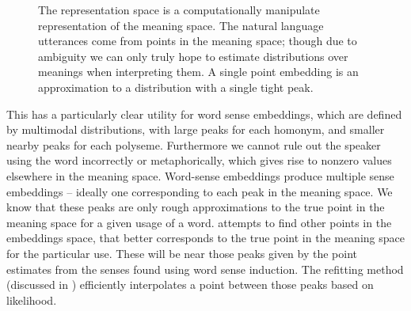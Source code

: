 \documentclass{book}
\begin{document}
\begin{figure}
	\centering
	\large
	\caption{\label{fig:spaces} The representation space is a computationally manipulate representation of the meaning space.
		The natural language utterances come from points in the meaning space; 
		though due to ambiguity we can only truly hope to estimate distributions over meanings when interpreting them.
		A single point embedding is an approximation to a distribution with a single tight peak.
	}
\end{figure}


This has a particularly clear utility for word sense embeddings,
which are defined by multimodal distributions,
with large peaks for each homonym, and smaller nearby peaks for each polyseme.
Furthermore we cannot rule out the speaker using the word incorrectly or metaphorically, which gives rise to nonzero values elsewhere in the meaning space.
Word-sense embeddings produce multiple sense embeddings -- ideally one corresponding to each peak in the meaning space.
We know that these peaks are only rough approximations to the true point in the meaning space for a given usage of a word.
 attempts to find other points in the embeddings space, that better corresponds to the true point in the meaning space for the particular use.
These will be near those peaks given by the point estimates from the senses found using word sense induction.
The refitting method (discussed in ) efficiently interpolates a point between those peaks based on likelihood.
\end{document}
